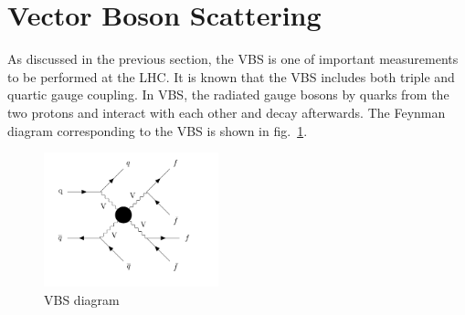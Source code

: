 


\section{Vector Boson Scattering} %
\label{sec:vector_boson_scattering}
As discussed in the previous section, the VBS is one of important measurements to be performed at the LHC. It is known that the VBS includes both triple and quartic gauge coupling. In VBS, the radiated gauge bosons by quarks from the two protons and interact with each other and decay afterwards. The Feynman diagram corresponding to the VBS is shown in fig.~\ref{fig:VBF_vv_vv}.
\begin{figure}[!htbp]
    \centering
    \includegraphics[width=0.45\textwidth]{Pictures/VBF_VV_VV.png}
    \caption{VBS diagram}
    \label{fig:VBF_vv_vv}
\end{figure}

